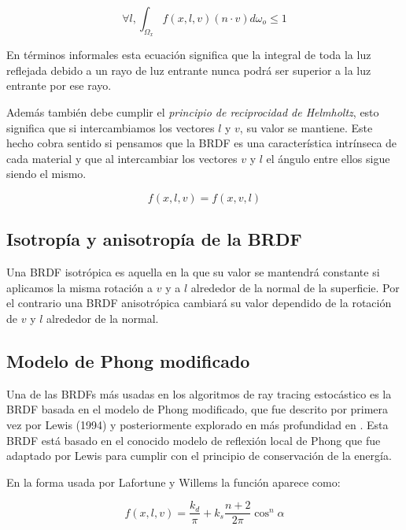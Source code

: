 \begin{equation}
\forall l, \int_{\Omega_x} f(x,l,v) (n \cdot v) d\omega_o \leq 1
\end{equation}

En términos informales esta ecuación significa que la integral de toda la luz reflejada debido a un rayo de luz entrante nunca podrá ser superior a la luz entrante por ese rayo.

\medskip
Además también debe cumplir el \emph{principio de reciprocidad de Helmholtz}, esto significa que si  intercambiamos los vectores $l$ y $v$, su valor se mantiene. Este hecho cobra sentido si  pensamos que la BRDF es una característica intrínseca de cada material y que al intercambiar los vectores $v$ y $l$ el ángulo entre ellos sigue siendo el mismo.

\begin{equation}
f(x, l, v) = f(x, v, l)
\end{equation} 

\subsection{Isotropía y anisotropía de la BRDF}

Una BRDF isotrópica es aquella en la que su valor se mantendrá constante si  aplicamos la misma rotación a $v$ y a $l$ alrededor de la normal de la superficie. Por el contrario una BRDF anisotrópica cambiará su valor dependido de la rotación de $v$ y $l$ alrededor de la normal.

\clearpage

\subsection{Modelo de Phong modificado}
Una de las BRDFs más usadas en los algoritmos de ray tracing estocástico es la BRDF basada en el modelo de Phong modificado, que fue descrito por primera vez por Lewis (1994) \nocite{Lewis1994} y posteriormente explorado en más profundidad en \cite{Lafortune1994}. Esta BRDF está basado en el conocido modelo de reflexión local de Phong \cite{Phong1975} que fue adaptado por Lewis para cumplir con el principio de conservación de la energía.

En la forma usada por Lafortune y Willems la función aparece como:

\begin{equation}
f(x, l, v) = \frac{k_d}{\pi} + k_s \frac{n + 2}{2 \pi} \cos^n\alpha
\end{equation}

